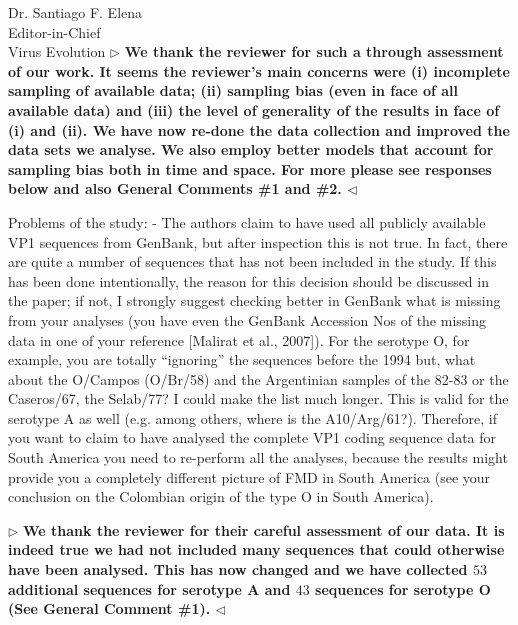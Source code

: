 \documentclass[12pt, a4paper]{letter} %
\newenvironment{reply}{$\triangleright$\bf}{$\triangleleft$}
\begin{document}
\begin{letter}{
	Dr. Santiago F. Elena\\
    Editor-in-Chief \\
    Virus Evolution
}
\begin{reply}
We thank the reviewer for such a through assessment of our work.
It seems the reviewer's main concerns were (i) incomplete sampling of available data; (ii) sampling bias (even in face of all available data) and (iii) the level of generality of the results in face of (i) and (ii).
We have now re-done the data collection and improved the data sets we analyse.
We also employ better models that account for sampling bias both in time and space.
For more please see responses below and also General Comments \#1 and \#2.
\end{reply}

Problems of the study:
-       The authors claim to have used all publicly available VP1 sequences from GenBank, but after inspection this is not true. 
In fact, there are quite a number of sequences that has not been included in the study. If this has been done intentionally, the reason for this decision should be discussed in the paper; if not, I strongly suggest checking better in GenBank what is missing from your analyses (you have even the GenBank Accession Nos of the missing data in one of your reference [Malirat et al., 2007]). 
For the serotype O, for example, you are totally ``ignoring'' the sequences before the 1994 but, what about the O/Campos (O/Br/58) and the Argentinian samples of the 82-83 or the Caseros/67, the Selab/77? I could make the list much longer. 
This is valid for the serotype A as well (e.g. among others, where is the A10/Arg/61?). 
Therefore, if you want to claim to have analysed the complete VP1 coding sequence data for South America you need to re-perform all the analyses, because the results might provide you a completely different picture of FMD in South America (see your conclusion on the Colombian origin of the type O in South America).

\begin{reply}
We thank the reviewer for their careful assessment of our data.
It is indeed true we had not included many sequences that could otherwise have been analysed.
This has now changed and we have collected $53$ additional sequences for serotype A and $43$ sequences for serotype O (See General Comment \#1).
\end{reply}


\end{letter}
\end{document}
